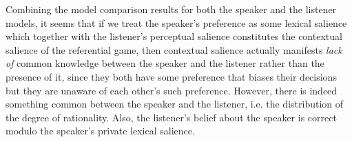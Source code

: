 \bigskip

Combining the model comparison results for both the speaker and the
listener models, it seems that if we treat the speaker's preference as
some lexical salience which together with the listener's perceptual
salience constitutes the contextual salience of the referential game,
then contextual salience actually manifests \emph{lack of} common
knowledge between the speaker and the listener rather than the
presence of it, since they both have some preference that biases their
decisions but they are unaware of each other's such
preference. However, there is indeed something common between the
speaker and the listener, i.e. the distribution of the degree of
rationality. Also, the listener's belief about the speaker is correct
modulo the speaker's private lexical salience.


